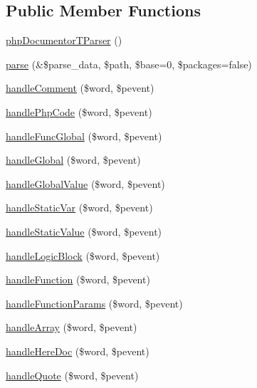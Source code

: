 \subsection*{\-Public \-Member \-Functions}
\begin{DoxyCompactItemize}
\item 
\hyperlink{classphp_documentor_t_parser_a8bed8f45419491723dbd3c69c1512217}{php\-Documentor\-T\-Parser} ()
\item 
\hyperlink{classphp_documentor_t_parser_a20139dbf0050f44b70e34bf32d89d7e4}{parse} (\&\$parse\-\_\-data, \$path, \$base=0, \$packages=false)
\item 
\hyperlink{classphp_documentor_t_parser_a20f0c871394d25d98cb94346b92b52ad}{handle\-Comment} (\$word, \$pevent)
\item 
\hyperlink{classphp_documentor_t_parser_a08a1dde387562480e8030e16e8472548}{handle\-Php\-Code} (\$word, \$pevent)
\item 
\hyperlink{classphp_documentor_t_parser_aeea50ac4c19702902041fa4c7886efdd}{handle\-Func\-Global} (\$word, \$pevent)
\item 
\hyperlink{classphp_documentor_t_parser_a14ba3a6a3b54d131fa2769a616736213}{handle\-Global} (\$word, \$pevent)
\item 
\hyperlink{classphp_documentor_t_parser_a0ccd4322dd89809afc72a800e4137ee4}{handle\-Global\-Value} (\$word, \$pevent)
\item 
\hyperlink{classphp_documentor_t_parser_a001679854479b7f7ef2b9d2f8ee1c1ed}{handle\-Static\-Var} (\$word, \$pevent)
\item 
\hyperlink{classphp_documentor_t_parser_a0388cdf67fc4bd4a046528d22e246bb4}{handle\-Static\-Value} (\$word, \$pevent)
\item 
\hyperlink{classphp_documentor_t_parser_a74750f3abb8dc11a29a566b51c414370}{handle\-Logic\-Block} (\$word, \$pevent)
\item 
\hyperlink{classphp_documentor_t_parser_a6dc39d8d613058ad93f476e91fdb7cf3}{handle\-Function} (\$word, \$pevent)
\item 
\hyperlink{classphp_documentor_t_parser_aabdf4a71f7610ba56a173ea10c5f541b}{handle\-Function\-Params} (\$word, \$pevent)
\item 
\hyperlink{classphp_documentor_t_parser_a87e25a238d2f075d47a558c3ae2da16e}{handle\-Array} (\$word, \$pevent)
\item 
\hyperlink{classphp_documentor_t_parser_a2aa7336642c079cb2e3596c9d83bb5c1}{handle\-Here\-Doc} (\$word, \$pevent)
\item 
\hyperlink{classphp_documentor_t_parser_a4ba20cc549548714f50dafced3b6ec71}{handle\-Quote} (\$word, \$pevent)

\end{DoxyCompactItemize}
